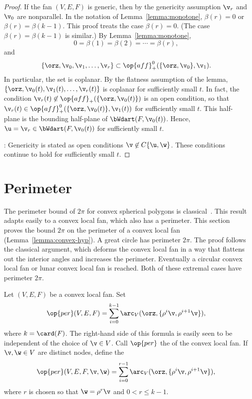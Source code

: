 \begin{proof}
If the fan $(V,E,F)$ is generic, then
by the genericity assumption $\v_r$ and
$\v_0$ are nonparallel.  In the notation of
Lemma~\ref{lemma:monotone}, $\beta(r) = 0$ or $\beta(r) =
\beta(k-1)$.  This proof treats the case $\beta(r)=0$. (The case
$\beta(r)=\beta(k-1)$ is similar.)  By Lemma~\ref{lemma:monotone},
\[ 0=\beta(1)=\beta(2)=\cdots=\beta(r),\] 
and 
\[ 
\{\orz,\v_0,\v_1,\ldots,\v_r\} \subset \op{aff}^0_+(\{\orz,\v_0\},\v_1).
\] 
In particular, the set is coplanar.  By the flatness assumption of
the lemma, $\{\orz,\v_0(t),\v_1(t),\ldots,\v_r(t)\}$ is coplanar for
sufficiently small $t$.  In fact, the condition $\v_r(t)\not\in
\op{aff}_+(\{\orz,\v_0(t)\})$ is an open condition, so that
$\v_r(t)\in \op{aff}^0_+(\{\orz,\v_0(t)\},\v_1(t))$ for sufficiently
small $t$.  This half-plane is the bounding half-plane of
$\bWdart(F,\v_0(t))$.  Hence, $\u = \v_r\in \bWdart(F,\v_0(t))$ for
sufficiently small $t$.

: Genericity is stated as open conditions $\v\not\in
C\{\u,\w\}$.  These conditions continue to hold for sufficiently small
$t$.
\end{proof}






\section{Perimeter}

The perimeter bound of $2\pi$ for convex spherical
polygons is classical~\cite[p.~100]{vanderWaerden:1951}.
This  result adapts easily  to a convex local fan, which also has
 a perimeter.  This section proves the bound $2\pi$ on the perimeter of a
convex local fan (Lemma~\ref{lemma:convex-hyp}).  A great circle has
perimeter $2\pi$.  The proof follows the classical argument, which deforms the convex
local fan in a way that flattens out the interior angles and increases
the perimeter.  Eventually a circular convex local fan or lunar convex
local fan is reached.  Both of these extremal cases have perimeter $2\pi$. 




\begin{definition}[perimeter]\label{lemma:perim}
Let $(V,E,F)$ be a convex local fan.    Set
\[ 
  \op{per}(V,E,F) 
= \sum_{i=0}^{k-1} \arc_V(\orz,\{\rho^i \v,\rho^{i+1} \v\}), 
\] 
where $k=\card(F)$.  The right-hand side of this formula is easily
seen to be independent of the choice of $\v\in V$.  Call $\op{per}$
the  of the convex local fan.  If $\v,\w\in V$ are
distinct nodes, define the 
\[ 
  \op{per}(V,E,F,\v,\w) 
= \sum_{i=0}^{r-1} \arc_V(\orz,\{\rho^i \v,\rho^{i+1} \v\}), 
\] 
where $r$ is chosen so that $\w=\rho^r \v$ and $0<r\le k-1$.
\end{definition}
%
%
%



